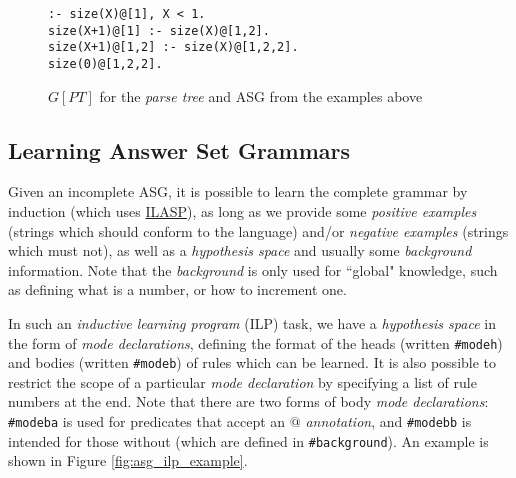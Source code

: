 \begin{figure}[H]
\centering
\texttt{:- size(X)@[1], X < 1. \\
           size(X+1)@[1] :- size(X)@[1,2]. \\
           size(X+1)@[1,2] :- size(X)@[1,2,2]. \\
           size(0)@[1,2,2].}
\caption{$G[PT]$ for the \textit{parse tree} and ASG from the examples above}
\label{fig:asg_tree_program_example}
\end{figure}

\subsection{Learning Answer Set Grammars}

Given an incomplete ASG, it is possible to learn the complete grammar by induction (which uses \href{http://www.ilasp.com}{ILASP}), as long as we provide some \textit{positive examples} (strings which should conform to the language) and/or \textit{negative examples}  (strings which must not), as well as a \textit{hypothesis space} and usually some \textit{background} information. Note that the \textit{background} is only used for ``global" knowledge, such as defining what is a number, or how to increment one. \cite{law_representing_2019}

In such an \textit{inductive learning program} (ILP) task, we have a \textit{hypothesis space} in the form of \textit{mode declarations}, defining the format of the heads (written \texttt{\#modeh}) and bodies (written \texttt{\#modeb}) of rules which can be learned. It is also possible to restrict the scope of a particular \textit{mode declaration} by specifying a list of rule numbers at the end. Note that there are two forms of body \textit{mode declarations}: \texttt{\#modeba} is used for predicates that accept an $@$ \textit{annotation}, and \texttt{\#modebb} is intended for those without (which are defined in \texttt{\#background}). An example is shown in Figure \ref{fig:asg_ilp_example}.


